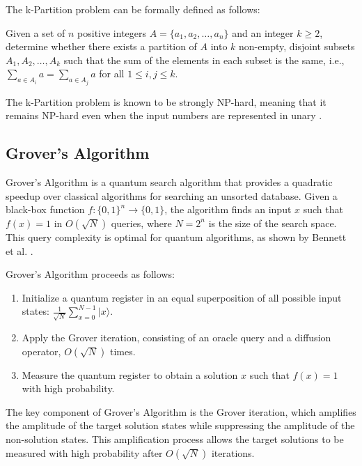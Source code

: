 The k-Partition problem can be formally defined as follows:

\begin{definition}
Given a set of $n$ positive integers $A = \{a_1, a_2, \ldots, a_n\}$ and an integer $k \geq 2$, determine whether there exists a partition of $A$ into $k$ non-empty, disjoint subsets $A_1, A_2, \ldots, A_k$ such that the sum of the elements in each subset is the same, i.e., $\sum_{a \in A_i} a = \sum_{a \in A_j} a$ for all $1 \leq i, j \leq k$.
\end{definition}

The k-Partition problem is known to be strongly NP-hard, meaning that it remains NP-hard even when the input numbers are represented in unary \cite{garey1979computers}.

\subsection{Grover's Algorithm}

Grover's Algorithm \cite{grover1996fast} is a quantum search algorithm that provides a quadratic speedup over classical algorithms for searching an unsorted database. Given a black-box function $f: \{0, 1\}^n \rightarrow \{0, 1\}$, the algorithm finds an input $x$ such that $f(x) = 1$ in $O(\sqrt{N})$ queries, where $N = 2^n$ is the size of the search space. This query complexity is optimal for quantum algorithms, as shown by Bennett et al. \cite{bennett1997strengths}.

Grover's Algorithm proceeds as follows:

\begin{enumerate}
    \item Initialize a quantum register in an equal superposition of all possible input states: $\frac{1}{\sqrt{N}}\sum_{x=0}^{N-1}|x\rangle$.

    \item Apply the Grover iteration, consisting of an oracle query and a diffusion operator, $O(\sqrt{N})$ times.

    \item Measure the quantum register to obtain a solution $x$ such that $f(x) = 1$ with high probability.

\end{enumerate}

The key component of Grover's Algorithm is the Grover iteration, which amplifies the amplitude of the target solution states while suppressing the amplitude of the non-solution states. This amplification process allows the target solutions to be measured with high probability after $O(\sqrt{N})$ iterations.

